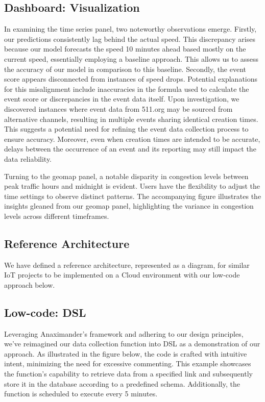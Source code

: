 \documentclass{report}
\begin{document}
\subsection{Dashboard: Visualization}
In examining the time series panel, two noteworthy observations emerge. Firstly, our predictions consistently lag behind the actual speed. This discrepancy arises because our model forecasts the speed 10 minutes ahead based mostly on the current speed, essentially employing a baseline approach. This allows us to assess the accuracy of our model in comparison to this baseline. Secondly, the event score appears disconnected from instances of speed drops. Potential explanations for this misalignment include inaccuracies in the formula used to calculate the event score or discrepancies in the event data itself. Upon investigation, we discovered instances where event data from 511.org may be sourced from alternative channels, resulting in multiple events sharing identical creation times. This suggests a potential need for refining the event data collection process to ensure accuracy. Moreover, even when creation times are intended to be accurate, delays between the occurrence of an event and its reporting may still impact the data reliability.

Turning to the geomap panel, a notable disparity in congestion levels between peak traffic hours and midnight is evident. Users have the flexibility to adjust the time settings to observe distinct patterns. The accompanying figure illustrates the insights gleaned from our geomap panel, highlighting the variance in congestion levels across different timeframes.


\subsection{Reference Architecture} 
We have defined a reference architecture, represented as a diagram, for similar IoT projects to be implemented on a Cloud environment with our low-code approach below.

\subsection{Low-code: DSL}
Leveraging Anaximander's framework and adhering to our design principles, we've reimagined our data collection function into DSL as a demonstration of our approach. As illustrated in the figure below, the code is crafted with intuitive intent, minimizing the need for excessive commenting. This example showcases the function's capability to retrieve data from a specified link and subsequently store it in the database according to a predefined schema. Additionally, the function is scheduled to execute every 5 minutes.
\end{document}
